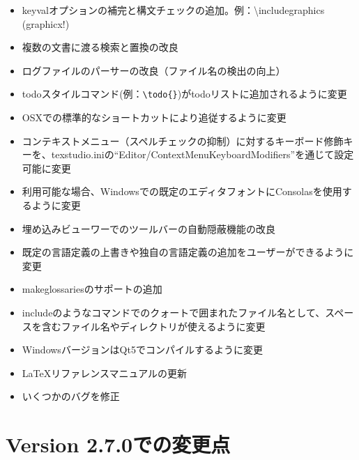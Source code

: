 \begin{itemize}
\item
  keyvalオプションの補完と構文チェックの追加。例：\textbackslash{}includegraphics (graphicx!)
\item
  複数の文書に渡る検索と置換の改良
\item
  ログファイルのパーサーの改良（ファイル名の検出の向上）
\item
  todoスタイルコマンド(例：\lstinline!\todo{}!)がtodoリストに追加されるように変更
\item
  OSXでの標準的なショートカットにより追従するように変更
\item
  コンテキストメニュー（スペルチェックの抑制）に対するキーボード修飾キーを、texstudio.iniの``Editor/ContextMenuKeyboardModifiers''を通じて設定可能に変更
\item
  利用可能な場合、Windowsでの既定のエディタフォントにConsolasを使用するように変更
\item
  埋め込みビューワーでのツールバーの自動隠蔽機能の改良
\item
  既定の言語定義の上書きや独自の言語定義の追加をユーザーができるように変更
\item
  makeglossariesのサポートの追加
\item
  includeのようなコマンドでのクォートで囲まれたファイル名として、スペースを含むファイル名やディレクトリが使えるように変更
\item
  WindowsバージョンはQt5でコンパイルするように変更
\item
  LaTeXリファレンスマニュアルの更新
\item
  いくつかのバグを修正
\end{itemize}

\section{Version 2.7.0での変更点}

